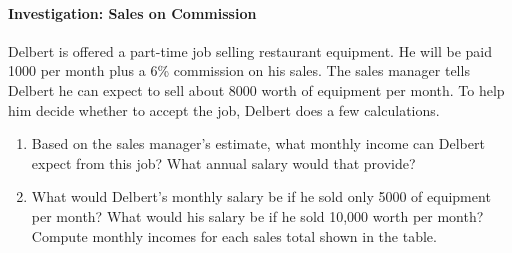 \documentclass[10pt,]{book}
\theoremstyle{plain}
\theoremstyle{definition}
\theoremstyle{definition}
\numberwithin{equation}{section}
\newcommand{\hrulethin}  {\noalign{\hrule height 0.04em}}
\newcommand{\hrulethick} {\noalign{\hrule height 0.11em}}
\newcounter{figstack}
\newlength\fight
\newcommand\pushValignCaptionBottom[5][b]{%
\stepcounter{figstack}%
\expandafter\def\csname %
figalign\romannumeral\value{figstack}\endcsname{#1}%
\expandafter\def\csname %
figtype\romannumeral\value{figstack}\endcsname{#2}%
\expandafter\def\csname %
figwd\romannumeral\value{figstack}\endcsname{#3}%
\expandafter\def\csname %
figcontent\romannumeral\value{figstack}\endcsname{#4}%
\expandafter\def\csname %
figcap\romannumeral\value{figstack}\endcsname{#5}%
\setbox0=\hbox{%
\begin{#2}{#3}#4\end{#2}}%
\ifdim\dimexpr\ht0+\dp0\relax>\fight\global\setlength{\fight}{%
\dimexpr\ht0+\dp0\relax}\fi%
}
\begin{document}
\paragraph[Investigation: Sales on Commission]{Investigation: Sales on Commission}\label{paragraphs-1}
Delbert is offered a part-time job selling restaurant equipment. He will be paid \textdollar{}1000 per month plus a 6\% commission on his sales. The sales manager tells Delbert he can expect to sell about \textdollar{}8000 worth of equipment per month. To help him decide whether to accept the job, Delbert does a few calculations.%
\par

                \leavevmode%
\begin{enumerate}
\item\hypertarget{li-1}{}Based on the sales manager’s estimate, what monthly income can Delbert expect from this job? What annual salary would that provide?%
\item\hypertarget{li-2}{}What would Delbert’s monthly salary be if he sold only \textdollar{}5000 of equipment per month? What would his salary be if he sold \textdollar{}10,000 worth per month? Compute monthly incomes for each sales total shown in the table.%
\leavevmode%
\end{enumerate}
\end{document}
